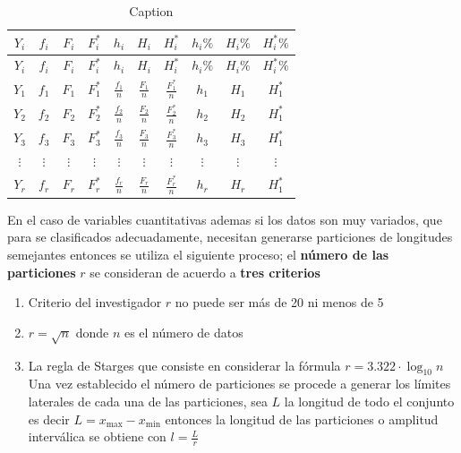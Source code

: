 \documentclass[10pt,]{krantz}
\theoremstyle{definition}
\theoremstyle{definition}
\theoremstyle{definition}
\theoremstyle{definition}
\theoremstyle{remark}
\begin{document}
\begin{longtable}[]{@{}cccccccccc@{}}
\caption{\label{tab:ww} Caption}\tabularnewline
\toprule
\(Y_i\) & \(f_i\) & \(F_i\) & \(F_i^*\) & \(h_i\) & \(H_i\) & \(H_i^*\) & \(h_i\%\) & \(H_i\%\) & \(H_i^*\%\)\tabularnewline
\midrule
\endfirsthead
\toprule
\(Y_i\) & \(f_i\) & \(F_i\) & \(F_i^*\) & \(h_i\) & \(H_i\) & \(H_i^*\) & \(h_i\%\) & \(H_i\%\) & \(H_i^*\%\)\tabularnewline
\midrule
\endhead
\(Y_1\) & \(f_1\) & \(F_1\) & \(F_1^*\) & \(\frac{f_1}{n}\) & \(\frac{F_1}{n}\) & \(\frac{F_1^*}{n}\) & \(h_1\) & \(H_1\) & \(H_1^*\)\tabularnewline
\(Y_2\) & \(f_2\) & \(F_2\) & \(F_2^*\) & \(\frac{f_2}{n}\) & \(\frac{F_2}{n}\) & \(\frac{F_2^*}{n}\) & \(h_2\) & \(H_2\) & \(H_1^*\)\tabularnewline
\(Y_3\) & \(f_3\) & \(F_3\) & \(F_3^*\) & \(\frac{f_3}{n}\) & \(\frac{F_3}{n}\) & \(\frac{F_3^*}{n}\) & \(h_3\) & \(H_3\) & \(H_1^*\)\tabularnewline
\(\vdots\) & \(\vdots\) & \(\vdots\) & \(\vdots\) & \(\vdots\) & \(\vdots\) & \(\vdots\) & \(\vdots\) & \(\vdots\) & \(\vdots\)\tabularnewline
\(Y_r\) & \(f_r\) & \(F_r\) & \(F_r^*\) & \(\frac{f_r}{n}\) & \(\frac{F_r}{n}\) & \(\frac{F_r^*}{n}\) & \(h_r\) & \(H_r\) & \(H_1^*\)\tabularnewline
\bottomrule
\end{longtable}

En el caso de variables cuantitativas ademas si los datos son muy variados, que para se clasificados adecuadamente, necesitan generarse particiones de longitudes semejantes entonces se utiliza el siguiente proceso; el \textbf{número de las particiones} \(r\) se consideran de acuerdo a \textbf{tres criterios}

\begin{enumerate}
\def\labelenumi{\arabic{enumi}.}
\item
  Criterio del investigador \(r\) no puede ser más de 20 ni menos de 5
\item
  \(r=\sqrt{n}\) donde \(n\) es el número de datos
\item
  La regla de Starges que consiste en considerar la fórmula \(r=3.322\cdot\log_{10} n\)
  Una vez establecido el número de particiones se procede a generar los límites laterales de cada una de las particiones, sea \(L\) la longitud de todo el conjunto es decir \(L=x_{\text{max}}-x_{\text{min}}\) entonces la longitud de las particiones o amplitud interválica se obtiene con \(l=\frac{L}{r}\)
\end{enumerate}
\end{document}
